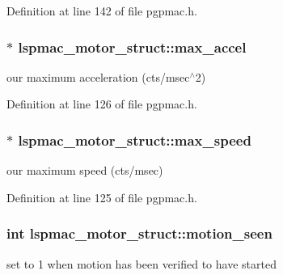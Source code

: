 Definition at line 142 of file pgpmac.\-h.

\hypertarget{structlspmac__motor__struct_a50cf4c0711cea164e332bc34705a1a68}{
\subsubsection[{max\-\_\-accel}]{$\ast$ lspmac\-\_\-motor\-\_\-struct\-::max\-\_\-accel}}\label{structlspmac__motor__struct_a50cf4c0711cea164e332bc34705a1a68}


our maximum acceleration (cts/msec$^\wedge$2) 



Definition at line 126 of file pgpmac.\-h.

\hypertarget{structlspmac__motor__struct_a69e49769a1001665377efc7193d88a0a}{
\subsubsection[{max\-\_\-speed}]{$\ast$ lspmac\-\_\-motor\-\_\-struct\-::max\-\_\-speed}}\label{structlspmac__motor__struct_a69e49769a1001665377efc7193d88a0a}


our maximum speed (cts/msec) 



Definition at line 125 of file pgpmac.\-h.

\hypertarget{structlspmac__motor__struct_a68c471836f52707fa8582f7860cf500f}{
\subsubsection[{motion\-\_\-seen}]{\setlength{\rightskip}{0pt plus 5cm}int lspmac\-\_\-motor\-\_\-struct\-::motion\-\_\-seen}}\label{structlspmac__motor__struct_a68c471836f52707fa8582f7860cf500f}


set to 1 when motion has been verified to have started 



